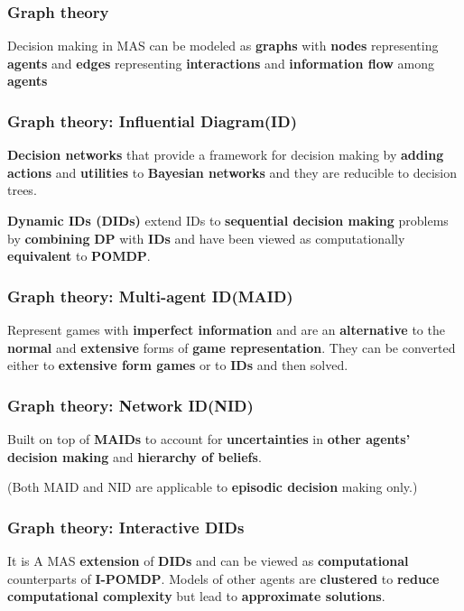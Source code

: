 \documentclass{beamer}
\begin{document}
	\begin{frame}
		\frametitle{Graph theory}
		Decision making in MAS can be modeled as \textbf{graphs} with \textbf{nodes} representing \textbf{agents} and \textbf{edges} representing \textbf{interactions} and \textbf{information flow} among \textbf{agents}
		
	\end{frame}

	\begin{frame}
		\frametitle{Graph theory: Influential Diagram(ID)}
		
		\textbf{Decision networks} that provide a framework for decision making by \textbf{adding} \textbf{actions} and \textbf{utilities} to \textbf{Bayesian networks} and they are reducible to decision trees. 
		
		\vspace{0.1in}
		\textbf{Dynamic IDs (DIDs)} extend IDs to \textbf{sequential decision making} problems by \textbf{combining} \textbf{DP} with \textbf{IDs} and have been viewed as computationally \textbf{equivalent} to \textbf{POMDP}.
		 
	\end{frame}

	\begin{frame}
		\frametitle{Graph theory: Multi-agent ID(MAID)}
		Represent games with \textbf{imperfect information} and are an \textbf{alternative} to the \textbf{normal} and \textbf{extensive} forms of \textbf{game representation}. They can be converted either to \textbf{extensive form games} or to \textbf{IDs} and then solved.
	\end{frame}

	\begin{frame}
		\frametitle{Graph theory: Network ID(NID)}
		Built on top of \textbf{MAIDs} to account for \textbf{uncertainties} in \textbf{other agents’ decision making} and \textbf{hierarchy of beliefs}.
		
		\vspace{0.1in}
		(Both MAID and NID are applicable to \textbf{episodic decision} making only.) 
	\end{frame}

	\begin{frame}
		\frametitle{Graph theory: Interactive DIDs}
		 It is A MAS \textbf{extension} of \textbf{DIDs} and can be viewed as \textbf{computational} counterparts of \textbf{I-POMDP}. Models of other agents are \textbf{clustered} to \textbf{reduce computational complexity} but lead to \textbf{approximate solutions}.
	\end{frame}
\end{document}
